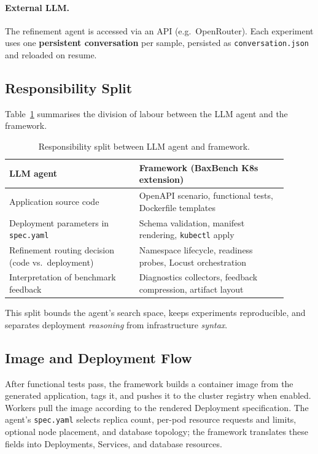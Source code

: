 \paragraph{External LLM.}
The refinement agent is accessed via an API (e.g.\ OpenRouter).  Each
experiment uses one \textbf{persistent conversation} per sample, persisted as
\texttt{conversation.json} and reloaded on resume.

\subsection{Responsibility Split}

Table~\ref{tab:responsibility-split} summarises the division of labour between
the LLM agent and the framework.

\begin{table}[t]
  \centering
  \caption{Responsibility split between LLM agent and framework.}
  \label{tab:responsibility-split}
  \small
  \begin{tabular}{@{}p{0.42\linewidth} p{0.48\linewidth}@{}}
    \toprule
    \textbf{LLM agent} & \textbf{Framework (BaxBench K8s extension)} \\
    \midrule
    Application source code &
      OpenAPI scenario, functional tests, Dockerfile templates \\
    Deployment parameters in \texttt{spec.yaml} &
      Schema validation, manifest rendering, \texttt{kubectl} apply \\
    Refinement routing decision (code vs.\ deployment) &
      Namespace lifecycle, readiness probes, Locust orchestration \\
    Interpretation of benchmark feedback &
      Diagnostics collectors, feedback compression, artifact layout \\
    \bottomrule
  \end{tabular}
\end{table}

This split bounds the agent's search space, keeps experiments reproducible,
and separates deployment \emph{reasoning} from infrastructure \emph{syntax}.

\subsection{Image and Deployment Flow}

After functional tests pass, the framework builds a container image from the
generated application, tags it, and pushes it to the cluster registry when
enabled.  Workers pull the image according to the rendered Deployment
specification.  The agent's \texttt{spec.yaml} selects replica count, per-pod
resource requests and limits, optional node placement, and database topology;
the framework translates these fields into Deployments, Services, and database
resources.


